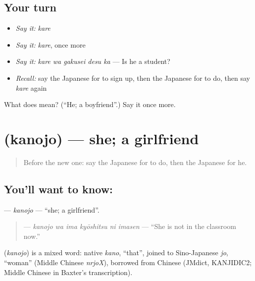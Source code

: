 \subsection*{Your turn}
\begin{itemize}
\raggedright
  \item \emph{Say it:} \emph{kare}
  \item \emph{Say it:} \emph{kare}, once more
  \item \emph{Say it:} \emph{kare wa gakusei desu ka} — Is he a student?
  \item \emph{Recall:} say the Japanese for to sign up, then the Japanese for to do, then say \emph{kare} again
\end{itemize}

\begin{tcolorbox}[breakable,colback=teal!4,colframe=teal!35!black,title={Before you move on}]
What does  mean? (\textquotedblleft{}He; a boyfriend\textquotedblright{}.) Say it once more.
\end{tcolorbox}
\section[\texorpdfstring{\ja{かのじょ} (kanojo)}{かのじょ (kanojo)}]{ (kanojo) — she; a girlfriend}

\label{lesson:JA-C242-kanojo}



\begin{quote}
Before the new one: say the Japanese for to do, then the Japanese for he.
\end{quote}

\subsection*{You'll want to know: }
\textbf{} — \emph{kanojo} — \textquotedblleft{}she; a girlfriend\textquotedblright{}.

\begin{quote}
\textbf{   } — \emph{kanojo wa ima kyōshitsu ni imasen} — \textquotedblleft{}She is not in the classroom now.\textquotedblright{}
\end{quote}

\begin{cousinweb}
\textbf{} (\emph{kanojo}) is a mixed word: native \emph{kano}, \textquotedblleft{}that\textquotedblright{}, joined to Sino-Japanese \emph{jo}, \textquotedblleft{}woman\textquotedblright{} (Middle Chinese \emph{nrjoX}), borrowed from Chinese (JMdict, KANJIDIC2; Middle Chinese in Baxter's transcription).
\end{cousinweb}

